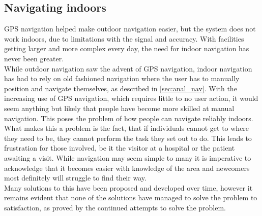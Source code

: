 \subsection{Navigating indoors}
GPS navigation helped make outdoor navigation easier, but the system does not work indoors, due to limitations with the signal and accuracy\cite{gps_tech}. With facilities getting larger and more complex every day, the need for indoor navigation has never been greater.\\
While outdoor navigation saw the advent of GPS navigation, indoor navigation has had to rely on old fashioned navigation where the user has to manually position and navigate themselves, as described in \cref{sec:anal_nav}. With the increasing use of GPS navigation, which requires little to no user action, it would seem anything but likely that people have become more skilled at manual navigation. This poses the problem of how people can navigate reliably indoors.\\
What makes this a problem is the fact, that if individuals cannot get to where they need to be, they cannot perform the task they set out to do. This leads to frustration for those involved, be it the visitor at a hospital or the patient awaiting a visit. While navigation may seem simple to many it is imperative to acknowledge that it becomes easier with knowledge of the area and newcomers most definitely will struggle to find their way.\\
Many solutions to this have been proposed and developed over time, however it remains evident that none of the solutions have managed to solve the problem to satisfaction, as proved by the continued attempts to solve the problem\cite{skejby_attempt}.


